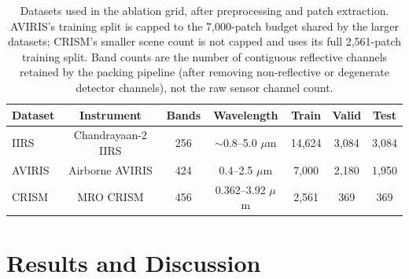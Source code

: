 \documentclass{article} %
\begin{document}
\begin{table}[t]
\centering
\small
\begin{tabular}{lcccccc}
\toprule
\textbf{Dataset} & \textbf{Instrument} & \textbf{Bands} & \textbf{Wavelength} & \textbf{Train} & \textbf{Valid} & \textbf{Test} \\
\midrule
IIRS & Chandrayaan-2 IIRS \citep{chowdhury2020iirs} & 256 & $\sim$0.8--5.0 $\mu$m & 14{,}624 & 3{,}084 & 3{,}084 \\
AVIRIS & Airborne AVIRIS \citep{green1998aviris} & 424 & 0.4--2.5 $\mu$m & 7{,}000 & 2{,}180 & 1{,}950 \\
CRISM & MRO CRISM \citep{murchie2007crism} & 456 & 0.362--3.92 $\mu$m & 2{,}561 & 369 & 369 \\
\bottomrule
\end{tabular}
\caption{Datasets used in the ablation grid, after preprocessing and patch extraction. AVIRIS's training split is capped to the 7{,}000-patch budget shared by the larger datasets; CRISM's smaller scene count is not capped and uses its full 2{,}561-patch training split. Band counts are the number of contiguous reflective channels retained by the packing pipeline (after removing non-reflective or degenerate detector channels), not the raw sensor channel count.}
\label{tab:datasets}
\end{table}

\section{Results and Discussion}
\label{sec:results}
\end{document}
